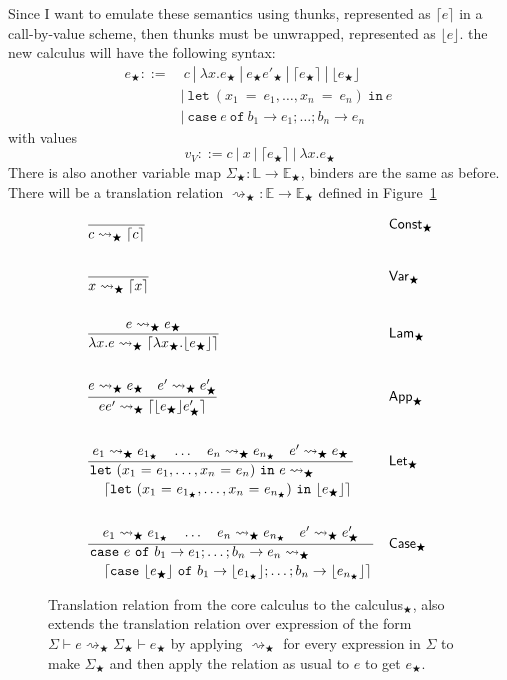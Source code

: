\documentclass[float=false, crop=false]{standalone}
\numberwithin{subcase}{case}
\newcommand{\tlang}{\bigstar}
\newcommand{\thunk}[1]{\lceil #1 \rceil}
\newcommand{\unwrap}[1]{\lfloor #1 \rfloor}
\newcommand{\tlthunk}{\rightsquigarrow_\tlang}
\begin{document}
Since I want to emulate these semantics using thunks, represented as $\thunk{e}$ in a call-by-value scheme, 
then thunks must be unwrapped, represented as $\unwrap{e}$. 
the new calculus will have the following syntax:
\begin{align*} 
  e_\tlang ::=&\ c\ |\ \lambda x.e_\tlang\ |\ e_\tlang e'_\tlang\ |\ \thunk{e_\tlang}\ |\ \unwrap{e_\tlang}
  \\ &|\ \mathtt{let}\ (x_1\ \mathtt{=}\ e_1,\dotsc, x_n\ \mathtt{=}\ e_n)\ \mathtt{in}\ e\
  \\ &|\ \mathtt{case}\ e\ \mathtt{of}\ b_1 \rightarrow e_1; \dots; b_n \rightarrow e_n
\end{align*}
with values 
\[ v_V ::= c\ |\ x\ |\ \thunk{e_\tlang}\ |\ \lambda x. e_\tlang \]
There is also another variable map $\Sigma_\tlang : \mathbb{L} \rightarrow \mathbb{E}_\tlang$, 
binders are the same as before.
There will be a translation relation $\tlthunk: \mathbb{E} \rightarrow \mathbb{E}_\tlang$
defined in Figure~\ref{t:translation}

\begin{figure}
\begin{align*}
  &\frac{}{c \tlthunk \thunk{c}} && \mathsf{Const}_\tlang\\ \\
  &\frac{}{x \tlthunk \thunk{x}} && \mathsf{Var}_\tlang\\ \\
  &\frac{e \tlthunk e_\tlang}
     {\lambda x . e \tlthunk \thunk{\lambda x_\tlang.\unwrap{e_\tlang}}}
       && \mathsf{Lam}_\tlang\\ \\
  &\frac{e  \tlthunk e_\tlang \quad e' \tlthunk e'_\tlang}
  {e e' \tlthunk \thunk{\unwrap{e_\tlang} e'_\tlang}} && \mathsf{App}_\tlang\\\\
  &\dfrac{e_1  \tlthunk e_{1_\tlang} \quad \dots \quad e_n \tlthunk e_{n_\tlang} \quad e' \tlthunk e_\tlang}
  {\splitdfrac{\mathtt{let}\ (x_1\ \mathtt{=}\ e_1,\dotsc, x_n\ \mathtt{=}\ e_n)\ \mathtt{in}\ e \tlthunk}
    {\thunk{\mathtt{let}\ 
        (x_1\ \mathtt{=}\ e_{1_\tlang},\dotsc, x_n\ \mathtt{=}\ e_{n_\tlang}) \ \mathtt{in}\ \unwrap{e_\tlang}}}} && \mathsf{Let}_\tlang\\ \\
  &\dfrac{e_1  \tlthunk e_{1_\tlang} \quad \dots \quad e_n \tlthunk e_{n_\tlang} \quad e' \tlthunk e'_\tlang}
  {\splitdfrac{\mathtt{case}\ e\ \mathtt{of}\ b_1 \rightarrow e_1; \dots; b_n \rightarrow e_n \tlthunk}
  {\thunk{\mathtt{case}\ \unwrap{e_\tlang}\ \mathtt{of}\ b_1 \rightarrow \unwrap{e_{1_\tlang}}; 
      \dots; b_n \rightarrow \unwrap{e_{n_\tlang}}}}} && \mathsf{Case}_\tlang
\end{align*}
\caption[Definition of translation relation from the core calculus to  calculus$_\tlang$]{Translation relation from the core calculus to the calculus$_\tlang$, also
extends the translation relation over expression of the form $\Sigma \vdash e \tlthunk \Sigma_\tlang 
\vdash e_\tlang$ by applying $\tlthunk$ for every expression in $\Sigma$ to make $\Sigma_\tlang$ and
then apply the relation as usual to $e$ to get $e_\tlang$.}
\label{t:translation}
\end{figure}
\end{document}
